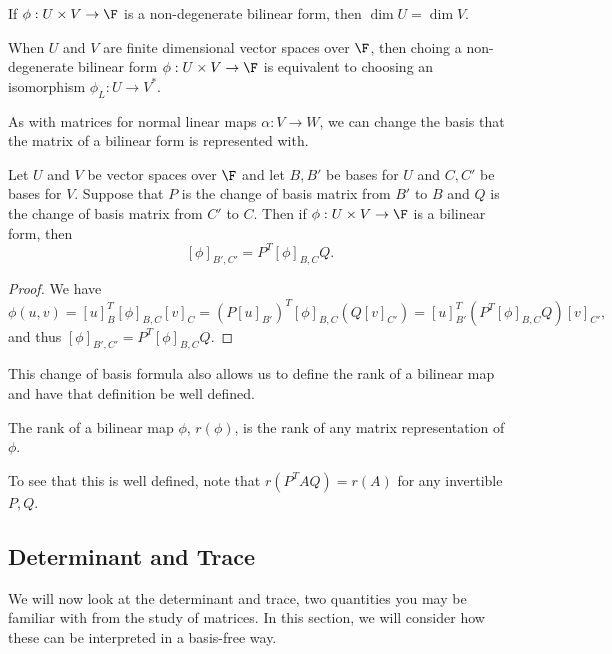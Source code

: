 \documentclass[a4paper]{scrartcl}
\begin{document}
\begin{corollary}
    If $\phi: U \times V \rightarrow \F$ is a non-degenerate bilinear form, then $\dim U = \dim V$.
\end{corollary}

\begin{corollary}
    When $U$ and $V$ are finite dimensional vector spaces over $\F$, then choing a non-degenerate bilinear form $\phi: U \times V \rightarrow \F$ is equivalent to choosing an isomorphism $\phi_L : U \rightarrow V^*$.
\end{corollary}

As with matrices for normal linear maps $\alpha: V \rightarrow W$, we can change the basis that the matrix of a bilinear form is represented with.

\begin{proposition}
    Let $U$ and $V$ be vector spaces over $\F$ and let $B, B'$ be bases for $U$ and $C, C'$ be bases for $V$. Suppose that $P$ is the change of basis matrix from $B'$ to $B$ and $Q$ is the change of basis matrix from $C'$ to $C$. Then if $\phi: U \times V \rightarrow \F$ is a bilinear form, then
    $$
    [\phi]_{B', C'} = P^T [\phi]_{B, C} Q.
    $$
\end{proposition}
\begin{proof}
    We have
    $$
        \phi(u, v) = [u]^T_B [\phi]_{B, C} [v]_C 
            = (P[u]_{B'})^T [\phi]_{B, C} (Q [v]_{C'}) 
                = [u]^T_{B'} (P^T [\phi]_{B, C} Q) [v]_{C'},
    $$
    and thus $[\phi]_{B', C'} = P^T [\phi]_{B, C} Q$.
\end{proof}

This change of basis formula also allows us to define the rank of a bilinear map and have that definition be well defined.

\begin{definition}
    The rank of a bilinear map $\phi$, $r(\phi)$, is the rank of any matrix representation of $\phi$. 
\end{definition}

To see that this is well defined, note that $r(P^T AQ) = r(A)$ for any invertible $P, Q$.

\subsection{Determinant and Trace}

We will now look at the determinant and trace, two quantities you may be familiar with from the study of matrices. In this section, we will consider how these can be interpreted in a basis-free way.
\end{document}
